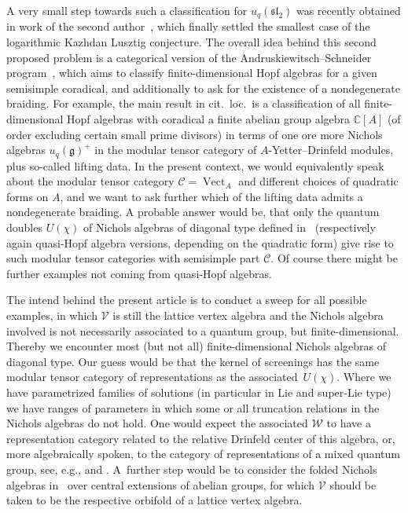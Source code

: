 \documentclass[10pt,a4paper]{amsart}
\numberwithin{equation}{section}
\newcommand{\C}{\mathbb{C}}
\begin{document}
A very small step towards such a classification for $u_q(\mathfrak{sl}_2)$ was recently obtained in work of the second author~\cite{CLR21}, which finally settled the smallest case of the logarithmic Kazhdan Lusztig conjecture. The overall idea behind this second proposed problem is a categorical version of the Andruskiewitsch--Schneider program~\cite{AS10}, which aims to classify finite-dimensional Hopf algebras for a given semisimple coradical, and additionally to ask for the existence of a nondegenerate braiding. For example, the main result in cit.~loc.~is a classification of all finite-dimensional Hopf algebras with coradical a finite abelian group algebra $\C[A]$ (of order excluding certain small prime divisors) in terms of one ore more Nichols algebras $u_q(\mathfrak{g})^+$ in the modular tensor category of $A$-Yetter--Drinfeld modules, plus so-called lifting data. In the present context, we would equivalently speak about the modular tensor category $\mathcal{C}=\operatorname{Vect}_{A}$ and different choices of quadratic forms on $A$, and we want to ask further which of the lifting data admits a nondegenerate braiding. A probable answer would be, that only the quantum doubles $U(\chi)$ of Nichols algebras of diagonal type defined in~\cite{Heck07} (respectively again quasi-Hopf algebra versions, depending on the quadratic form) give rise to such modular tensor categories with semisimple part $\mathcal{C}$. Of course there might be further examples not coming from quasi-Hopf algebras.

The intend behind the present article is to conduct a sweep for all possible examples, in which $\mathcal{V}$ is still the lattice vertex algebra and the Nichols algebra involved is not necessarily associated to a quantum group, but finite-dimensional. Thereby we encounter most (but not all) finite-dimensional Nichols algebras of diagonal type. Our guess would be that the kernel of screenings has the same modular tensor category of representations as the associated~$U(\chi)$. Where we have parametrized families of solutions (in particular in Lie and super-Lie type) we have ranges of parameters in which some or all truncation relations in the Nichols algebras do not hold. One would expect the associated $\mathcal{W}$ to have a representation category related to the relative Drinfeld center of this algebra, or, more algebraically spoken, to the category of representations of a mixed quantum group, see, e.g., \cite{G21, GG17} and \cite{Ang16, L19}. A~further step would be to consider the folded Nichols algebras in~\cite{Len14} over central extensions of abelian groups, for which $\mathcal{V}$ should be taken to be the respective orbifold of a lattice vertex algebra.
\end{document}
